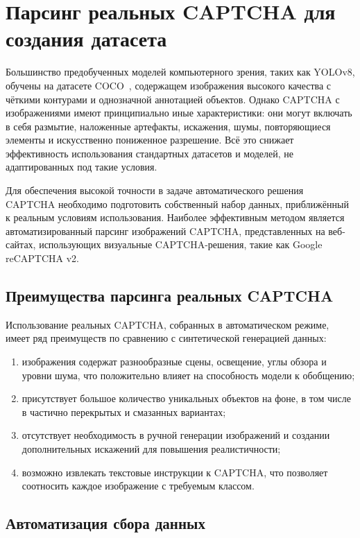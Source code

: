 \chapter{Парсинг реальных CAPTCHA для создания датасета}

Большинство предобученных моделей компьютерного зрения, таких как YOLOv8, обучены на датасете COCO~\cite{COCO}, содержащем изображения высокого качества с чёткими контурами и однозначной аннотацией объектов. Однако CAPTCHA с изображениями имеют принципиально иные характеристики: они могут включать в себя размытие, наложенные артефакты, искажения, шумы, повторяющиеся элементы и искусственно пониженное разрешение. Всё это снижает эффективность использования стандартных датасетов и моделей, не адаптированных под такие условия.

Для обеспечения высокой точности в задаче автоматического решения CAPTCHA необходимо подготовить собственный набор данных, приближённый к реальным условиям использования. Наиболее эффективным методом является автоматизированный парсинг изображений CAPTCHA, представленных на веб-сайтах, использующих визуальные CAPTCHA-решения, такие как Google reCAPTCHA v2.

\section{Преимущества парсинга реальных CAPTCHA}

Использование реальных CAPTCHA, собранных в автоматическом режиме, имеет ряд преимуществ по сравнению с синтетической генерацией данных:

\begin{enumerate}
    \item изображения содержат разнообразные сцены, освещение, углы обзора и уровни шума, что положительно влияет на способность модели к обобщению;
    \item присутствует большое количество уникальных объектов на фоне, в том числе в частично перекрытых и смазанных вариантах;
    \item отсутствует необходимость в ручной генерации изображений и создании дополнительных искажений для повышения реалистичности;
    \item возможно извлекать текстовые инструкции к CAPTCHA, что позволяет соотносить каждое изображение с требуемым классом.
\end{enumerate}

\section{Автоматизация сбора данных}

